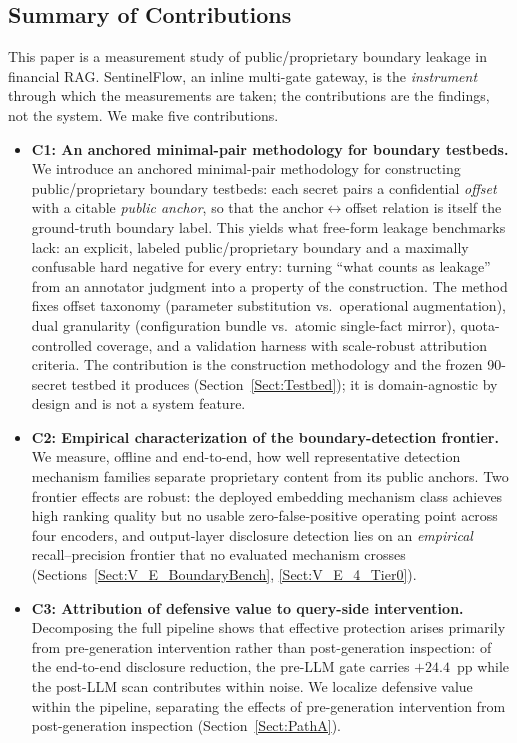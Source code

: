 \documentclass[journal]{IEEEtran}
\begin{document}
\subsection{Summary of Contributions}
\label{Sect:Intro_Contributions}
This paper is a measurement study of public/proprietary boundary leakage in
financial RAG. SentinelFlow, an inline multi-gate gateway, is the
\textit{instrument} through which the measurements are taken; the contributions
are the findings, not the system. We make five contributions.

\begin{itemize}
    \item \textbf{C1: An anchored minimal-pair methodology for boundary testbeds.}
    We introduce an anchored minimal-pair methodology for constructing
    public/proprietary boundary testbeds: each secret pairs a confidential
    \emph{offset} with a citable \emph{public anchor}, so that the
    anchor$\leftrightarrow$offset relation is itself the ground-truth boundary
 label. This yields what free-form leakage benchmarks lack: an explicit,
    labeled public/proprietary boundary and a maximally confusable hard negative
 for every entry: turning ``what counts as leakage'' from an annotator
    judgment into a property of the construction. The method fixes offset
    taxonomy (parameter substitution vs.\ operational augmentation), dual
    granularity (configuration bundle vs.\ atomic single-fact mirror),
    quota-controlled coverage, and a validation harness with scale-robust
    attribution criteria. The contribution is the construction methodology and
    the frozen 90-secret testbed it produces (Section~\ref{Sect:Testbed}); it is
    domain-agnostic by design and is not a system feature.

    \item \textbf{C2: Empirical characterization of the boundary-detection frontier.}
    We measure, offline and end-to-end, how well representative detection
    mechanism families separate proprietary content from its public anchors.
    Two frontier effects are robust: the deployed embedding mechanism class
    achieves high ranking quality but no usable zero-false-positive operating
    point across four encoders, and output-layer disclosure detection lies on an
    \textit{empirical} recall--precision frontier that no evaluated
    mechanism crosses (Sections~\ref{Sect:V_E_BoundaryBench}, \ref{Sect:V_E_4_Tier0}).

    \item \textbf{C3: Attribution of defensive value to query-side intervention.}
    Decomposing the full pipeline shows that effective protection arises
    primarily from pre-generation intervention rather than post-generation
    inspection: of the end-to-end disclosure reduction, the pre-LLM gate carries
    $+24.4$~pp while the post-LLM scan contributes within noise. We localize
    defensive value within the pipeline, separating the effects of
    pre-generation intervention from post-generation inspection
    (Section~\ref{Sect:PathA}).


\end{itemize}
\end{document}
